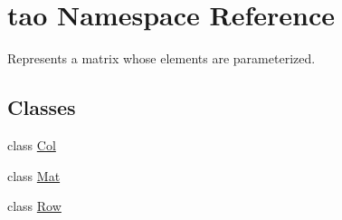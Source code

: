 \hypertarget{namespacetao}{}\section{tao Namespace Reference}
\label{namespacetao}


Represents a matrix whose elements are parameterized.  


\subsection*{Classes}
\begin{DoxyCompactItemize}
\item 
class \mbox{\hyperlink{classtao_1_1_col}{Col}}
\item 
class \mbox{\hyperlink{classtao_1_1_mat}{Mat}}
\item 
class \mbox{\hyperlink{classtao_1_1_row}{Row}}
\end{DoxyCompactItemize}

